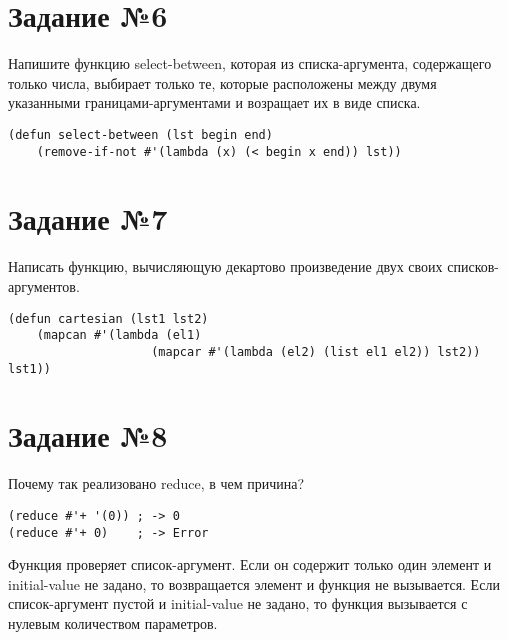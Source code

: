 \section{Задание №6}

Напишите функцию select-between, которая из списка-аргумента, содержащего
только числа, выбирает только те, которые расположены между двумя указанными
границами-аргументами и возращает их в виде списка.

\vspace{4mm}
\begin{minipage}{0.92\linewidth}
\begin{lstlisting}
(defun select-between (lst begin end)
    (remove-if-not #'(lambda (x) (< begin x end)) lst))
\end{lstlisting}
\end{minipage}

\section{Задание №7}

Написать функцию, вычисляющую декартово произведение двух своих
списков-аргументов.

\vspace{4mm}
\begin{minipage}{0.92\linewidth}
\begin{lstlisting}
(defun cartesian (lst1 lst2)
    (mapcan #'(lambda (el1)
                    (mapcar #'(lambda (el2) (list el1 el2)) lst2)) lst1))
\end{lstlisting}
\end{minipage}

\section{Задание №8}

Почему так реализовано reduce, в чем причина?

\vspace{4mm}
\begin{minipage}{0.92\linewidth}
\begin{lstlisting}
(reduce #'+ '(0)) ; -> 0
(reduce #'+ 0)    ; -> Error
\end{lstlisting}
\end{minipage}

Функция проверяет список-аргумент. Если он содержит только один элемент и
initial-value не задано, то возвращается элемент и функция не вызывается.
Если список-аргумент пустой и initial-value не задано, то функция вызывается с
нулевым количеством параметров.

